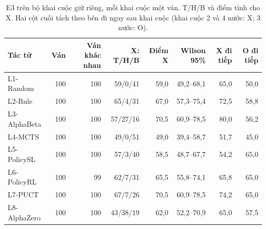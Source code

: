 \begin{table}[H]
  \centering\footnotesize
  \caption{E3 trên bộ khai cuộc giữ riêng, mỗi khai cuộc một ván. T/H/B và điểm tính cho X. Hai cột cuối tách theo bên đi ngay sau khai cuộc (khai cuộc 2 và 4 nước: X; 3 nước: O).}
  \label{tab:e3-giu-rieng}
  \setlength{\tabcolsep}{4pt}
  \begin{tabular}{@{}lrrrrrrr@{}}
    \toprule
    Tác tử & Ván & Ván khác nhau & X: T/H/B & Điểm X & Wilson 95\% & X đi tiếp & O đi tiếp \\
    \midrule
    L1-Random & 100 & 100 & 59/0/41 & 59{,}0 & 49{,}2--68{,}1 & 65{,}0 & 50{,}0 \\
    L2-Rule & 100 & 100 & 65/4/31 & 67{,}0 & 57{,}3--75{,}4 & 72{,}5 & 58{,}8 \\
    L3-AlphaBeta & 100 & 100 & 57/27/16 & 70{,}5 & 60{,}9--78{,}5 & 80{,}0 & 56{,}2 \\
    L4-MCTS & 100 & 100 & 49/0/51 & 49{,}0 & 39{,}4--58{,}7 & 51{,}7 & 45{,}0 \\
    L5-PolicySL & 100 & 100 & 57/3/40 & 58{,}5 & 48{,}7--67{,}7 & 54{,}2 & 65{,}0 \\
    L6-PolicyRL & 100 & 99 & 62/7/31 & 65{,}5 & 55{,}8--74{,}1 & 65{,}8 & 65{,}0 \\
    L7-PUCT & 100 & 100 & 67/7/26 & 70{,}5 & 60{,}9--78{,}5 & 74{,}2 & 65{,}0 \\
    L8-AlphaZero & 100 & 100 & 43/38/19 & 62{,}0 & 52{,}2--70{,}9 & 65{,}0 & 57{,}5 \\
    \bottomrule
  \end{tabular}
\end{table}

